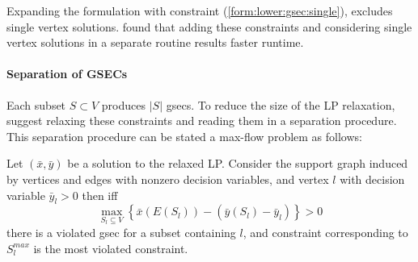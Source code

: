  Expanding the formulation with constraint (\ref{form:lower:gsec:single}), excludes single vertex solutions.
 \citet{lucena2004strong} found that adding these constraints and
 considering single vertex solutions in a separate routine results faster runtime.

 \paragraph{Separation of GSECs} Each subset $S \subset V$ produces $|S|$ \glspl{gsec}. To reduce the size of the LP relaxation,
 \citet{lucena2004strong} suggest relaxing these constraints and reading them in a separation procedure.
 This separation procedure can be stated a max-flow problem as follows:

 Let $(\bar{x}, \bar{y})$ be a solution to the relaxed LP. Consider the support graph induced by vertices and edges with nonzero decision variables,
  and vertex $l$ with decision variable $\bar y_l > 0$
  then iff
  \[\max_{S_l \subseteq V} \left\{ \bar x (E(S_l)) - (\bar y (S_l) - \bar y_l) \right\} > 0\]
  there is a violated \gls{gsec} for a subset containing $l$, and constraint corresponding to $S_l^{max}$ is the most violated constraint.

